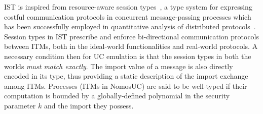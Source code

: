 IST is inspired from resource-aware session types~\cite{das2018work}, a type system for expressing costful communication protocols
in concurrent message-passing processes which has been successfully employed in quantitative analysis of distributed
protocols~\cite{dasnomos,Das20FSCD,Das22LMCS,Das20arxiv}.
Session types in IST prescribe and enforce bi-directional communication protocols between ITMs, both in the ideal-world functionalities and real-world protocols.
A necessary condition then for UC emulation is that the session types in both the worlds \emph{must match exactly}.
The import value of a message is also directly encoded in its type, thus providing a static description of the import exchange
among ITMs.
Processes (ITMs in NomosUC) are said to be well-typed if their computation is bounded by a globally-defined polynomial in the security parameter $k$ and the import they possess.

